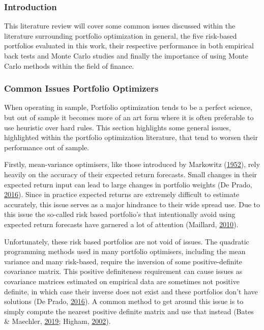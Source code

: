 \documentclass[11pt,preprint, authoryear]{elsarticle}
\numberwithin{equation}{section}
\numberwithin{figure}{section}
\numberwithin{table}{section}
\begin{document}
\hypertarget{introduction-1}{%
\subsubsection{Introduction}\label{introduction-1}}

This literature review will cover some common issues discussed within
the literature surrounding portfolio optimization in general, the five
risk-based portfolios evaluated in this work, their respective
performance in both empirical back tests and Monte Carlo studies and
finally the importance of using Monte Carlo methods within the field of
finance.

\hypertarget{common-issues-portfolio-optimizers}{%
\subsubsection{Common Issues Portfolio
Optimizers}\label{common-issues-portfolio-optimizers}}

When operating in sample, Portfolio optimization tends to be a perfect
science, but out of sample it becomes more of an art form where it is
often preferable to use heuristic over hard rules. This section
highlights some general issues, highlighted within the portfolio
optimization literature, that tend to worsen their performance out of
sample.

Firstly, mean-variance optimisers, like those introduced by Markowitz
(\protect\hyperlink{ref-markowitz}{1952}), rely heavily on the accuracy
of their expected return forecasts. Small changes in their expected
return input can lead to large changes in portfolio weights (De Prado,
\protect\hyperlink{ref-lopez}{2016}). Since in practice expected returns
are extremely difficult to estimate accurately, this issue serves as a
major hindrance to their wide spread use. Due to this issue the
so-called risk based portfolio's that intentionally avoid using expected
return forecasts have garnered a lot of attention (Maillard,
\protect\hyperlink{ref-maillard2010}{2010}).

Unfortunately, these risk based portfolios are not void of issues. The
quadratic programming methods used in many portfolio optimisers,
including the mean variance and many risk-based, require the inversion
of some positive-definite covariance matrix. This positive definiteness
requirement can cause issues as covariance matrices estimated on
empirical data are sometimes not positive definite, in which case their
inverse does not exist and these portfolios don't have solutions (De
Prado, \protect\hyperlink{ref-lopez}{2016}). A common method to get
around this issue is to simply compute the nearest positive definite
matrix and use that instead (Bates \& Maechler,
\protect\hyperlink{ref-Matrix}{2019}; Higham,
\protect\hyperlink{ref-higham2002}{2002}).
\end{document}
